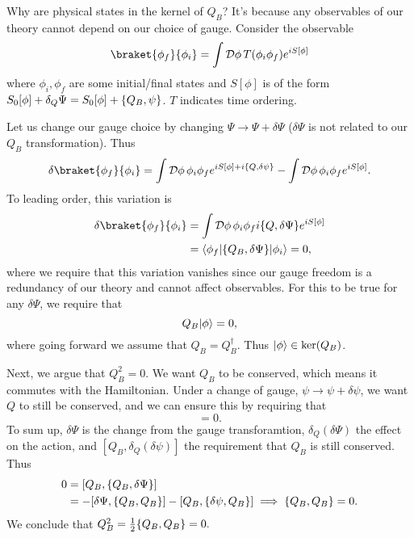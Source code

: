 Why are physical states in the kernel of $Q_B$? It's because any observables of our theory cannot depend on our choice of gauge. Consider the observable
\begin{equation*}
    \braket{\phi_f}{\phi_i}=\int \cD \phi\, T(\phi_i \phi_f) e^{iS[\phi]}
\end{equation*}
where $\phi_i,\phi_f$ are some initial/final states and $S[\phi]$ is of the form $S_0[\phi]+\delta_Q \Psi=S_0[\phi]+\{Q_B,\psi\}$. $T$ indicates time ordering.

Let us change our gauge choice by changing $\Psi\to \Psi+ \delta \Psi$ ($\delta \Psi$ is not related to our $Q_B$ transformation). Thus
\begin{equation}
    \delta\braket{\phi_f}{\phi_i} =\int \cD \phi\, \phi_i \phi_f e^{iS[\phi]+i\set{Q,\delta \psi}}-\int \cD \phi \, \phi_i \phi_f e^{iS[\phi]}.
\end{equation}
To leading order, this variation is
\begin{align*}
    \delta \braket{\phi_f}{\phi_i} &= \int \cD \phi\, \phi_i \phi_f i\set{Q,\delta\Psi} e^{iS[\phi]}\\
        &= \bra{\phi_f} \set{Q_B,\delta \Psi}\ket{\phi_i}=0,
\end{align*}
where we require that this variation vanishes since our gauge freedom is a redundancy of our theory and cannot affect observables. For this to be true for any $\delta \Psi$, we require that
\begin{equation}
    Q_B\lvert\phi\rangle=0,
\end{equation}
where going forward we assume that $Q_B=Q_B^\dagger$. Thus $\lvert\phi\rangle\in \ker(Q_B)$.

Next, we argue that $Q_B^2=0$. We want $Q_B$ to be conserved, which means it commutes with the Hamiltonian. Under a change of gauge, $\psi\to \psi+\delta \psi$, we want $Q$ to still be conserved, and we can ensure this by requiring that
\begin{equation}
    [Q_B,\delta_Q(\delta \Psi)]=0.
\end{equation}
To sum up, $\delta \Psi$ is the change from the gauge transforamtion, $\delta_Q(\delta\Psi)$ the effect on the action, and $[Q_B,\delta_Q (\delta \psi)]$ the requirement that $Q_B$ is still conserved. Thus
\begin{align*}
    0 &= [Q_B,\{Q_B,\delta \Psi\}]\\
        &= -[\delta \Psi,\{Q_B,Q_B\}]-[Q_B,\{\delta \psi,Q_B\}] \implies \{Q_B,Q_B\}=0.
\end{align*}
We conclude that $Q_B^2= \frac{1}{2}\{Q_B,Q_B\}=0.$